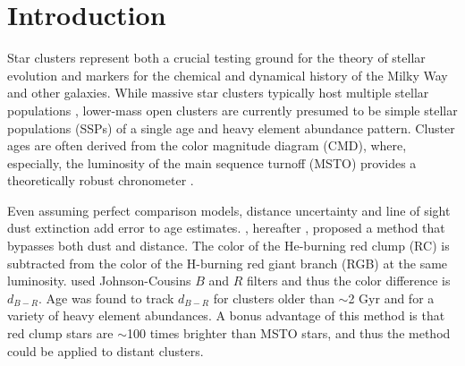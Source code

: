 \documentclass[twocolumn,times]{aastex631}
\begin{document}

\section{Introduction} \label{section_intro}

Star clusters represent both a crucial testing ground for the theory of stellar evolution and markers for the chemical and dynamical history of the Milky Way and other galaxies. While massive star clusters typically host multiple stellar populations \citep{2012A&ARv..20...50G}, lower-mass open clusters are currently presumed to be simple stellar populations (SSPs) of a single age and heavy element abundance pattern. Cluster ages are often derived from the color magnitude diagram (CMD), where, especially, the luminosity of the main sequence turnoff (MSTO) provides a theoretically robust chronometer \citep{1995ApJ...444L...9C}.

Even assuming perfect comparison models, distance uncertainty and line of sight dust extinction add error to age estimates. 
\citet{1991MNRAS.251..545H}, hereafter , proposed a method that bypasses both dust and distance. The color of the He-burning red clump (RC) is subtracted from the color of the H-burning red giant branch (RGB) at the same luminosity.  used Johnson-Cousins $B$ and $R$ filters and thus the color difference is $d_{B-R}$. Age was found to track $d_{B-R}$ for clusters older than $\sim$2 Gyr and for a variety of heavy element abundances. A bonus advantage of this method is that red clump stars are $\sim$100 times brighter than MSTO stars, and thus the method could be applied to distant clusters.
\end{document}
